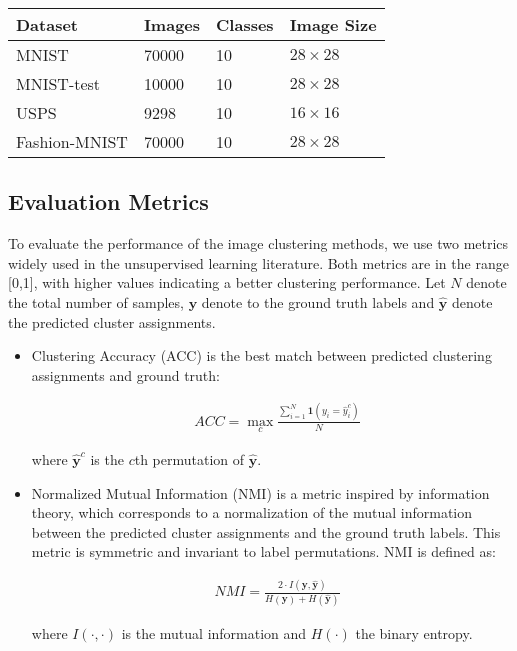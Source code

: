 \documentclass[11pt]{article}
\theoremstyle{definition}
\begin{document}
\begin{table}
	\centering
	\label{table:image clustering datasets}
	\begin{tabular}{|llll|}
		\hline
		Dataset &  Images &  Classes & Image Size \\
		\hline
		MNIST \cite{LeCun_MnistDataset_1998} & 70000 & 10 & $28 \times 28$ \\
		MNIST-test \cite{LeCun_MnistDataset_1998} & 10000 & 10 & $28 \times 28$ \\
		USPS \cite{Hull_USPSDataset_1994} & 9298 & 10 & $16 \times 16$ \\
		Fashion-MNIST \cite{Xiao_FashionMNIST_2017} & 70000 & 10 & $28 \times 28$  \\
\hline
		
	\end{tabular}
\end{table}
      
      

\subsection{Evaluation Metrics}

To evaluate the performance of the image clustering methods, we use two metrics widely used in the unsupervised learning literature. Both metrics are in the range [0,1], with higher values indicating a better clustering performance. Let $N$ denote the total number of samples, $\mathbf{y}$ denote to the ground truth labels and $\mathbf{\hat{y}}$ denote the predicted cluster assignments.

\begin{itemize}
	\item Clustering Accuracy (ACC) is the best match between predicted clustering assignments and ground truth:
	
	\vspace{-0.3cm}
	\begin{align}
	& ACC = \max_c \frac{\sum_{i=1}^{N} \mathbf{1}({y_i = \hat{y}_i^c})} {N}
	\end{align}
	
	where $\mathbf{\hat{y}}^c$ is the $c$th permutation of $\mathbf{\hat{y}}$.
	
	\item Normalized Mutual Information \cite{Vinh_InformationTheoreticMeasuresClusteringEvaluation_2010} (NMI) is a metric inspired by information theory, which corresponds to a normalization of the mutual information between the predicted cluster assignments and the ground truth labels. This metric is symmetric and invariant to label permutations. NMI is defined as:
	
	\vspace{-0.4cm}
	\begin{align}
	& NMI = \frac{2 \cdot I(\mathbf{y}, \mathbf{\hat{y}})}{H(\mathbf{y}) + H(\mathbf{\hat{y}})}
	\end{align}
	
	where $I(\cdot, \cdot)$ is the mutual information and $H(\cdot)$ the binary entropy.
	
\end{itemize}
\end{document}
